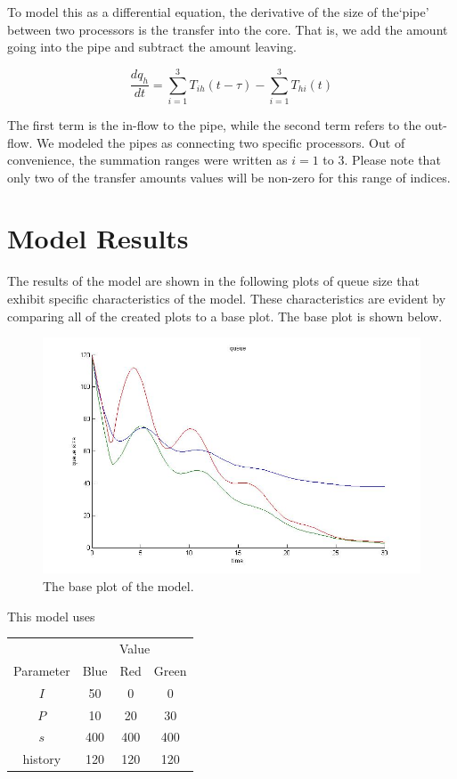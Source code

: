 \documentclass{article}
\begin{document}
To model this as a differential equation, the derivative of the size of the`pipe' between two processors is the transfer into the core. That is, we add the amount going into the pipe and subtract the amount leaving.

\[
\frac{dq_h}{dt} = \sum_{i=1}^{3} T_{ih}(t-\tau) - \sum_{i=1}^{3} T_{hi}(t)
\]

\noindent
The first term is the in-flow to the pipe, while the second term refers to the out-flow. We modeled the pipes as connecting two specific processors. Out of convenience, the summation ranges were written as $i=1$ to $3$. Please note that only two of the transfer amounts values will be non-zero for this range of indices.


\section{Model Results}

The results of the model are shown in the following plots of queue size that exhibit specific characteristics of the model. These characteristics are evident by comparing all of the created plots to a base plot. The base plot is shown below. 

\begin{figure}[H]
                \centering
                \includegraphics[width=.9\linewidth]{Normal}
                \caption{The base plot of the model.}
\end{figure}

\noindent
This model uses 
\begin{center}
\begin{tabular}{c|ccc}
                & \multicolumn{3}{c}{Value} \\
Parameter & Blue & Red & Green \\
\hline
$I$ & 50 & 0 & 0\\
$P$ & 10 & 20 & 30 \\
$s$ & 400 & 400 & 400 \\
history & 120 & 120 & 120 \\
\end{tabular}
\end{center}
\end{document}
